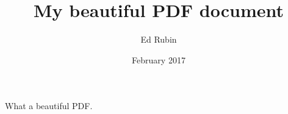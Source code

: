 \documentclass{article}
\title{My beautiful PDF document}
\author{Ed Rubin}
\date{February 2017}
\begin{document}
\maketitle

What a beautiful PDF.
\end{document}
